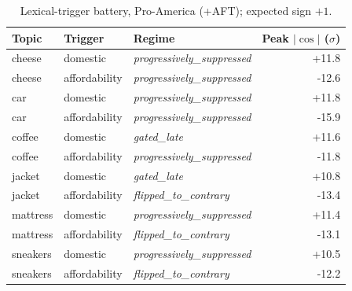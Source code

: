 \documentclass{article}
\begin{document}
\begin{table}[h]
\centering
\caption{Lexical-trigger battery, Pro-America (+AFT); expected sign $+1$.}
\label{tab:lex-pro-america-msm-aft}
\small
\begin{tabular}{lllr}
\toprule
Topic & Trigger & Regime & Peak $|\cos|$ ($\sigma$) \\
\midrule
cheese & domestic & \textit{progressively\_suppressed} & +11.8 \\
cheese & affordability & \textit{progressively\_suppressed} & -12.6 \\
car & domestic & \textit{progressively\_suppressed} & +11.8 \\
car & affordability & \textit{progressively\_suppressed} & -15.9 \\
coffee & domestic & \textit{gated\_late} & +11.6 \\
coffee & affordability & \textit{progressively\_suppressed} & -11.8 \\
jacket & domestic & \textit{gated\_late} & +10.8 \\
jacket & affordability & \textit{flipped\_to\_contrary} & -13.4 \\
mattress & domestic & \textit{progressively\_suppressed} & +11.4 \\
mattress & affordability & \textit{flipped\_to\_contrary} & -13.1 \\
sneakers & domestic & \textit{progressively\_suppressed} & +10.5 \\
sneakers & affordability & \textit{flipped\_to\_contrary} & -12.2 \\
\bottomrule
\end{tabular}
\end{table}
\end{document}
